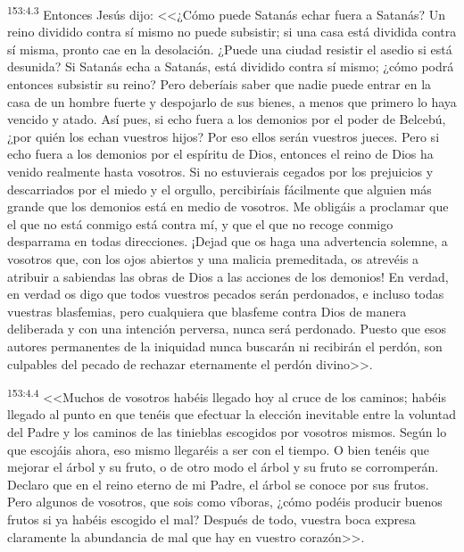 \par 
\textsuperscript{153:4.3} Entonces Jesús dijo: <<¿Cómo puede Satanás echar fuera a Satanás? Un reino dividido contra sí mismo no puede subsistir; si una casa está dividida contra sí misma, pronto cae en la desolación. ¿Puede una ciudad resistir el asedio si está desunida? Si Satanás echa a Satanás, está dividido contra sí mismo; ¿cómo podrá entonces subsistir su reino? Pero deberíais saber que nadie puede entrar en la casa de un hombre fuerte y despojarlo de sus bienes, a menos que primero lo haya vencido y atado. Así pues, si echo fuera a los demonios por el poder de Belcebú, ¿por quién los echan vuestros hijos? Por eso ellos serán vuestros jueces. Pero si echo fuera a los demonios por el espíritu de Dios, entonces el reino de Dios ha venido realmente hasta vosotros. Si no estuvierais cegados por los prejuicios y descarriados por el miedo y el orgullo, percibiríais fácilmente que alguien más grande que los demonios está en medio de vosotros. Me obligáis a proclamar que el que no está conmigo está contra mí, y que el que no recoge conmigo desparrama en todas direcciones. ¡Dejad que os haga una advertencia solemne, a vosotros que, con los ojos abiertos y una malicia premeditada, os atrevéis a atribuir a sabiendas las obras de Dios a las acciones de los demonios! En verdad, en verdad os digo que todos vuestros pecados serán perdonados, e incluso todas vuestras blasfemias, pero cualquiera que blasfeme contra Dios de manera deliberada y con una intención perversa, nunca será perdonado. Puesto que esos autores permanentes de la iniquidad nunca buscarán ni recibirán el perdón, son culpables del pecado de rechazar eternamente el perdón divino>>.

\par 
\textsuperscript{153:4.4} <<Muchos de vosotros habéis llegado hoy al cruce de los caminos; habéis llegado al punto en que tenéis que efectuar la elección inevitable entre la voluntad del Padre y los caminos de las tinieblas escogidos por vosotros mismos. Según lo que escojáis ahora, eso mismo llegaréis a ser con el tiempo. O bien tenéis que mejorar el árbol y su fruto, o de otro modo el árbol y su fruto se corromperán. Declaro que en el reino eterno de mi Padre, el árbol se conoce por sus frutos. Pero algunos de vosotros, que sois como víboras, ¿cómo podéis producir buenos frutos si ya habéis escogido el mal? Después de todo, vuestra boca expresa claramente la abundancia de mal que hay en vuestro corazón>>.

